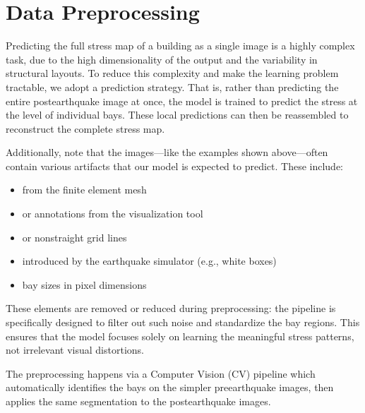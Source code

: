\documentclass[letterpaper,10pt,english]{sphinxmanual}
\begin{document}
\section{Data Preprocessing}
\label{\detokenize{data:data-preprocessing}}\label{\detokenize{data:preprocessing}}
\sphinxAtStartPar
Predicting the full stress map of a building as a single image is a highly
complex task, due to the high dimensionality of the output and the variability
in structural layouts.
To reduce this complexity and make the learning problem tractable, we adopt a
 prediction strategy.
That is, rather than predicting the entire post\sphinxhyphen{}earthquake image at once, the
model is trained to predict the stress at the level of individual bays.
These local predictions can then be reassembled to reconstruct the complete
stress map.

\sphinxAtStartPar
Additionally, note that the images—like the examples shown above—often contain
various artifacts that our model is  expected to predict.
These include:
\begin{itemize}
\item {} 
\sphinxAtStartPar
{} from the finite element mesh

\item {} 
\sphinxAtStartPar
{} or annotations from the visualization tool

\item {} 
\sphinxAtStartPar
{} or non\sphinxhyphen{}straight grid lines

\item {} 
\sphinxAtStartPar
{} introduced by the earthquake simulator (e.g., white boxes)

\item {} 
\sphinxAtStartPar
{} bay sizes in pixel dimensions

\end{itemize}

\sphinxAtStartPar
These elements are removed or reduced during preprocessing: the pipeline is
specifically designed to filter out such noise and standardize the bay regions.
This ensures that the model focuses solely on learning the meaningful stress
patterns, not irrelevant visual distortions.

\sphinxAtStartPar
\textendash{}

\sphinxAtStartPar
The preprocessing happens via a Computer Vision (CV) pipeline which
automatically identifies the bays on the simpler pre\sphinxhyphen{}earthquake images, then
applies the same segmentation to the post\sphinxhyphen{}earthquake images.
\end{document}
